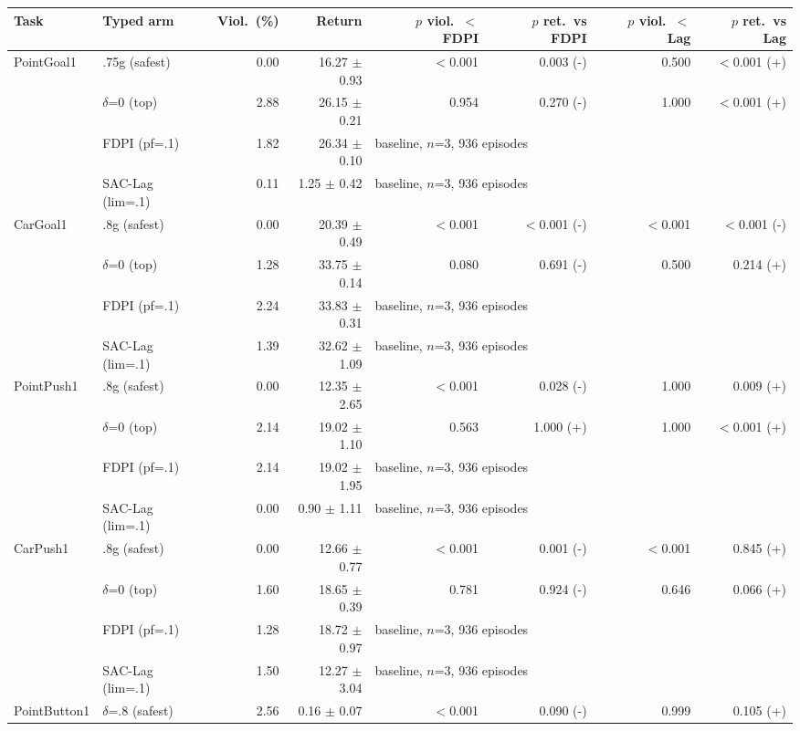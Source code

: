 \begin{tabular}{llrrrrrr}
\toprule
Task & Typed arm & Viol.\ (\%) & Return & $p$ viol.\ $<$ FDPI & $p$ ret.\ vs FDPI & $p$ viol.\ $<$ Lag & $p$ ret.\ vs Lag \\
\midrule
PointGoal1 & .75g (safest) & 0.00 & 16.27 $\pm$ 0.93 & $<$0.001 & 0.003 (-) & 0.500 & $<$0.001 (+) \\
 & $\delta$=0 (top) & 2.88 & 26.15 $\pm$ 0.21 & 0.954 & 0.270 (-) & 1.000 & $<$0.001 (+) \\
 & FDPI (pf=.1) & 1.82 & 26.34 $\pm$ 0.10 & \multicolumn{4}{l}{baseline, $n$=3, 936 episodes} \\
 & SAC-Lag (lim=.1) & 0.11 & 1.25 $\pm$ 0.42 & \multicolumn{4}{l}{baseline, $n$=3, 936 episodes} \\
\midrule
CarGoal1 & .8g (safest) & 0.00 & 20.39 $\pm$ 0.49 & $<$0.001 & $<$0.001 (-) & $<$0.001 & $<$0.001 (-) \\
 & $\delta$=0 (top) & 1.28 & 33.75 $\pm$ 0.14 & 0.080 & 0.691 (-) & 0.500 & 0.214 (+) \\
 & FDPI (pf=.1) & 2.24 & 33.83 $\pm$ 0.31 & \multicolumn{4}{l}{baseline, $n$=3, 936 episodes} \\
 & SAC-Lag (lim=.1) & 1.39 & 32.62 $\pm$ 1.09 & \multicolumn{4}{l}{baseline, $n$=3, 936 episodes} \\
\midrule
PointPush1 & .8g (safest) & 0.00 & 12.35 $\pm$ 2.65 & $<$0.001 & 0.028 (-) & 1.000 & 0.009 (+) \\
 & $\delta$=0 (top) & 2.14 & 19.02 $\pm$ 1.10 & 0.563 & 1.000 (+) & 1.000 & $<$0.001 (+) \\
 & FDPI (pf=.1) & 2.14 & 19.02 $\pm$ 1.95 & \multicolumn{4}{l}{baseline, $n$=3, 936 episodes} \\
 & SAC-Lag (lim=.1) & 0.00 & 0.90 $\pm$ 1.11 & \multicolumn{4}{l}{baseline, $n$=3, 936 episodes} \\
\midrule
CarPush1 & .8g (safest) & 0.00 & 12.66 $\pm$ 0.77 & $<$0.001 & 0.001 (-) & $<$0.001 & 0.845 (+) \\
 & $\delta$=0 (top) & 1.60 & 18.65 $\pm$ 0.39 & 0.781 & 0.924 (-) & 0.646 & 0.066 (+) \\
 & FDPI (pf=.1) & 1.28 & 18.72 $\pm$ 0.97 & \multicolumn{4}{l}{baseline, $n$=3, 936 episodes} \\
 & SAC-Lag (lim=.1) & 1.50 & 12.27 $\pm$ 3.04 & \multicolumn{4}{l}{baseline, $n$=3, 936 episodes} \\
\midrule
PointButton1 & $\delta$=.8 (safest) & 2.56 & 0.16 $\pm$ 0.07 & $<$0.001 & 0.090 (-) & 0.999 & 0.105 (+) \\

\end{tabular}
